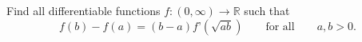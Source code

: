 Find all differentiable functions $f:(0,\infty) \to \mathbb{R}$ such that
$$f(b)-f(a)=(b-a)f’(\sqrt{ab}) \qquad \text{for all}\qquad a,b>0.$$
